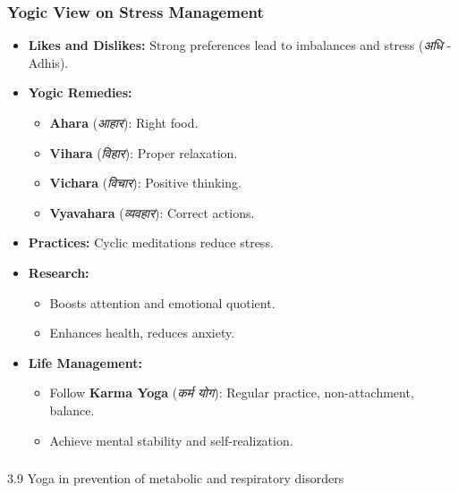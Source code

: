 \begin{frame}[fragile]\frametitle{Yogic View on Stress Management}

    \begin{itemize}
        \item \textbf{Likes and Dislikes:} 
        Strong preferences lead to imbalances and stress (\textit{अधि} - Adhis).
        \item \textbf{Yogic Remedies:}
        \begin{itemize}
            \item \textbf{Ahara} (\textit{आहार}): Right food.
            \item \textbf{Vihara} (\textit{विहार}): Proper relaxation.
            \item \textbf{Vichara} (\textit{विचार}): Positive thinking.
            \item \textbf{Vyavahara} (\textit{व्यवहार}): Correct actions.
        \end{itemize}
        \item \textbf{Practices:} 
        Cyclic meditations reduce stress.
        \item \textbf{Research:} 
        \begin{itemize}
            \item Boosts attention and emotional quotient.
            \item Enhances health, reduces anxiety.
        \end{itemize}
        \item \textbf{Life Management:}
        \begin{itemize}
            \item Follow \textbf{Karma Yoga} (\textit{कर्म योग}): Regular practice, non-attachment, balance.
            \item Achieve mental stability and self-realization.
        \end{itemize}
    \end{itemize}

\end{frame}


\begin{frame}[fragile]\frametitle{}
\begin{center}
{\Large 3.9 Yoga in prevention of metabolic and respiratory disorders}
\end{center}
\end{frame}

